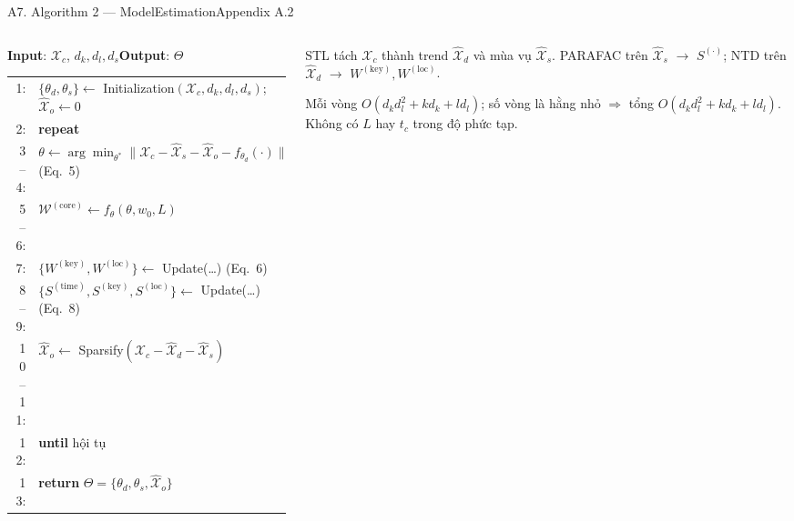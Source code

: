 \begin{frame}[fragile]{A7. Algorithm 2 --- ModelEstimation}{Appendix A.2}
\begin{columns}[T,onlytextwidth]
\begin{column}{0.60\textwidth}
\begin{questioncard}
\small
\textbf{Input}: $\mathcal X_c$, $d_k,d_l,d_s$\quad \textbf{Output}: $\Theta$\par\vspace{1mm}
\begin{tabular}{@{}r@{\;\;}l@{}}
1: & $\{\theta_d,\theta_s\}\leftarrow$ Initialization$(\mathcal X_c,d_k,d_l,d_s)$;\; $\widehat{\mathcal X}_o\leftarrow0$\\
2: & \textbf{repeat}\\
3--4: & \quad $\theta\leftarrow\arg\min_{\theta^*}\|\mathcal X_c-\widehat{\mathcal X}_s-\widehat{\mathcal X}_o-f_{\theta_d}(\cdot)\|$ \hfill (Eq.~5)\\
5--6: & \quad $\mathcal W^{(\mathrm{core})}\leftarrow f_\theta(\theta,w_0,L)$\\
7: & \quad $\{W^{(\mathrm{key})},W^{(\mathrm{loc})}\}\leftarrow$ Update(\ldots) \hfill (Eq.~6)\\
8--9: & \quad $\{S^{(\mathrm{time})},S^{(\mathrm{key})},S^{(\mathrm{loc})}\}\leftarrow$ Update(\ldots) \hfill (Eq.~8)\\
10--11: & \quad $\widehat{\mathcal X}_o\leftarrow$ Sparsify$(\mathcal X_c-\widehat{\mathcal X}_d-\widehat{\mathcal X}_s)$\\
12: & \textbf{until} hội tụ\\
13: & \textbf{return} $\Theta=\{\theta_d,\theta_s,\widehat{\mathcal X}_o\}$
\end{tabular}
\end{questioncard}
\end{column}
\begin{column}{0.37\textwidth}
\begin{intuition}
  \small STL tách $\mathcal X_c$ thành trend $\widehat{\mathcal X}_d$ và mùa vụ $\widehat{\mathcal X}_s$.
  PARAFAC trên $\widehat{\mathcal X}_s$ $\to$ $S^{(\cdot)}$; NTD trên $\widehat{\mathcal X}_d$ $\to$ $W^{(\mathrm{key})},W^{(\mathrm{loc})}$.
\end{intuition}
\vspace{2mm}
\begin{takeaway}[Lemma 1]
  \small Mỗi vòng $O(d_k d_l^2+k d_k+l d_l)$; số vòng là hằng nhỏ
  $\Rightarrow$ tổng $O(d_k d_l^2+k d_k+l d_l)$.\\
  Không có $L$ hay $t_c$ trong độ phức tạp.
\end{takeaway}
\end{column}
\end{columns}
\vfill
{}
\end{frame}

